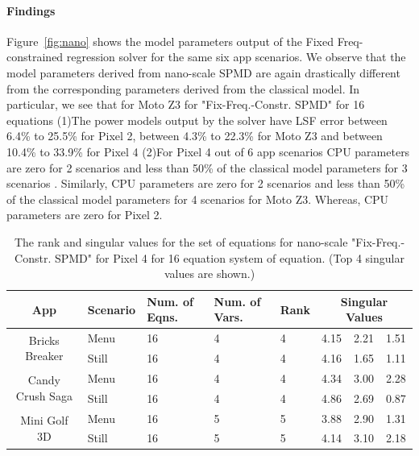 \paragraph{Findings}
Figure~\ref{fig:nano} shows the model parameters output of the Fixed Freq-constrained regression solver for the same six app scenarios.
We observe that the model parameters derived from nano-scale SPMD are again drastically different from the corresponding parameters derived from the classical model.
In particular, we see that for Moto Z3 for "Fix-Freq.-Constr. SPMD" for 16 equations
(1)The power models output by the solver have LSF error
between 6.4\% to 25.5\% for Pixel 2, between 4.3\% to 22.3\% for Moto Z3 and between 10.4\% to 33.9\% for Pixel 4
(2)For  Pixel 4 out of 6 app scenarios CPU parameters are zero for 2 scenarios and less than 50\% of the classical model parameters for 3 scenarios .
Similarly, CPU parameters are zero for 2 scenarios and less than 50\%  of the classical model parameters for 4 scenarios for Moto Z3.
Whereas, CPU parameters are zero for Pixel 2.

\begin{table}[tp]
{\footnotesize
    \centering
    \caption{The rank and singular values for the set of equations for nano-scale "Fix-Freq.-Constr. SPMD" for Pixel 4  for 16 equation system of equation.
    (Top 4 singular values are shown.)
    }
    \vspace{-0.1in}
    \begin{tabular}{|c|p{9mm}|p{4.5mm}|p{4.5mm}|p{4.5mm}|p{4mm}|p{4mm}|p{4mm}|}
    \hline
        App & Scenario & Num. of Eqns. & Num. of Vars. & Rank &  \multicolumn{3}{c|}{Singular Values} \\
        \hline
        \multirow{2}{13mm}{Bricks Breaker} & Menu & 16 & 4 & 4 & 4.15  & 2.21  & 1.51 \\
         \cline{2-8}
         & Still & 16 & 4 & 4 & 4.16  & 1.65  & 1.11 \\
         \hline
        \multirow{2}{13mm}{Candy Crush Saga} & Menu & 16 & 4 & 4 & 4.34  & 3.00  & 2.28 \\
        \cline{2-8}
	     & Still & 16 & 4 & 4 & 4.86  & 2.69  & 0.87 \\
	     \hline
         \multirow{2}{13mm}{Mini Golf 3D} & Menu & 16 & 5 & 5 & 3.88  & 2.90  & 1.31 \\
         \cline{2-8}
         & Still & 16 & 5 & 5 & 4.14  & 3.10  & 2.18\\
         \hline

    \end{tabular}
    \label{tab:nano-rank_motoz3}
    \vspace{-0.1in}
}
\end{table}


